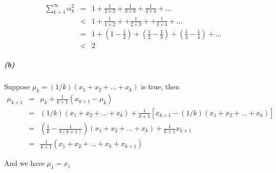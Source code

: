 \documentclass{article}
\begin{document}
\begin{eqnarray*}
	\sum_{k=1}^{\infty} \alpha_k^2 &=& 1 + \frac{1}{2 \times 2} + \frac{1}{3 \times 3}  + \frac{1}{4 \times 4} + ...\\
	&<& 1 + \frac{1}{1 \times 2} + + \frac{1}{2 \times 3} + + \frac{1}{3 \times 4} + ...\\
	&=& 1 + (1 - \frac{1}{2}) + (\frac{1}{2} - \frac{1}{3}) + (\frac{1}{3} - \frac{1}{4}) + ...\\
	&<& 2 
\end{eqnarray*}

\subparagraph*{(b)}
Suppose $\mu_k = (1/k) (x_1 + x_2 + ... + x_k)$ is true, then
\begin{eqnarray*}
	\mu_{k+1} &=& \mu_k + \frac{1}{k+1}(x_{k+1} - \mu_k)\\
	&=& (1/k) (x_1 + x_2 + ... + x_k) + \frac{1}{k+1} [x_{k+1} - (1/k) (x_1 + x_2 + ... + x_k)]\\
	&=& (\frac{1}{k} - \frac{1}{k(k+1)})(x_1 + x_2 + ... + x_k) + \frac{1}{k+1} x_{k+1}\\
	&=& \frac{1}{k+1}(x_1 + x_2 + ... + x_k + x_{k+1})
\end{eqnarray*}

And we have $\mu_1 = x_1$
\end{document}
